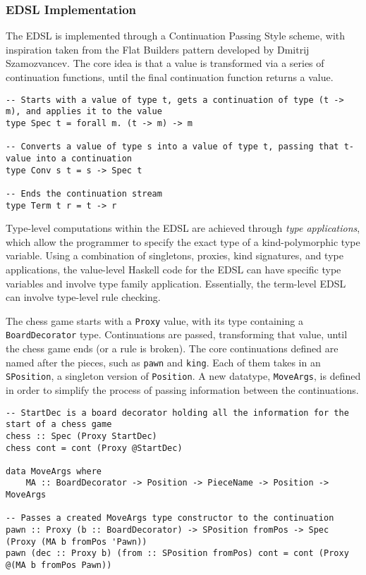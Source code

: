 \documentclass[12pt, a4paper]{scrartcl}
\begin{document}
\subsubsection{EDSL Implementation}

The EDSL is implemented through a Continuation Passing Style\cite{cps} scheme, with inspiration taken from the Flat Builders pattern developed by Dmitrij Szamozvancev\cite{mezzo}. The core idea is that a value is transformed via a series of continuation functions, until the final continuation function returns a value.

\begin{lstlisting}
-- Starts with a value of type t, gets a continuation of type (t -> m), and applies it to the value
type Spec t = forall m. (t -> m) -> m

-- Converts a value of type s into a value of type t, passing that t-value into a continuation
type Conv s t = s -> Spec t

-- Ends the continuation stream
type Term t r = t -> r
\end{lstlisting}

Type-level computations within the EDSL are achieved through \emph{type applications}\cite{typeapplication}, which allow the programmer to specify the exact type of a kind-polymorphic type variable. Using a combination of singletons, proxies, kind signatures, and type applications, the value-level Haskell code for the EDSL can have specific type variables and involve type family application. Essentially, the term-level EDSL can involve type-level rule checking.

The chess game starts with a \lstinline{Proxy} value, with its type containing a \lstinline{BoardDecorator} type. Continuations are passed, transforming that value, until the chess game ends (or a rule is broken). The core continuations defined are named after the pieces, such as \lstinline{pawn} and \lstinline{king}. Each of them takes in an \lstinline{SPosition}, a singleton version of \lstinline{Position}. A new datatype, \lstinline{MoveArgs}, is defined in order to simplify the process of passing information between the continuations.

\begin{lstlisting}
-- StartDec is a board decorator holding all the information for the start of a chess game
chess :: Spec (Proxy StartDec)
chess cont = cont (Proxy @StartDec)

data MoveArgs where
    MA :: BoardDecorator -> Position -> PieceName -> Position -> MoveArgs

-- Passes a created MoveArgs type constructor to the continuation
pawn :: Proxy (b :: BoardDecorator) -> SPosition fromPos -> Spec (Proxy (MA b fromPos 'Pawn))
pawn (dec :: Proxy b) (from :: SPosition fromPos) cont = cont (Proxy @(MA b fromPos Pawn))
\end{lstlisting}
\end{document}
